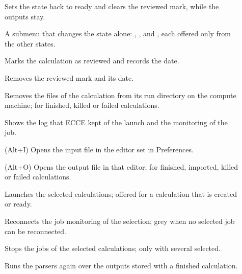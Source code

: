 \begin{description}
	\item[] Sets the state back to ready and clears the reviewed mark, while the outputs stay.
	\item[] A submenu that changes the state alone: , ,  and , each offered only from the other states.
	\item[] Marks the calculation as reviewed and records the date.
	\item[] Removes the reviewed mark and its date.
	\item[] Removes the files of the calculation from its run directory on the compute machine; for finished, killed or failed calculations.
	\item[] Shows the log that ECCE kept of the launch and the monitoring of the job.
	\item[] (\textsf{Alt+I}) Opens the input file in the editor set in Preferences.
	\item[] (\textsf{Alt+O}) Opens the output file in that editor; for finished, imported, killed or failed calculations.
	\item[] Launches the selected calculations; offered for a calculation that is created or ready.
	\item[] Reconnects the job monitoring of the selection; grey when no selected job can be reconnected.
	\item[] Stops the jobs of the selected calculations; only with several selected.
	\item[] Runs the parsers again over the outputs stored with a finished calculation.
\end{description}


